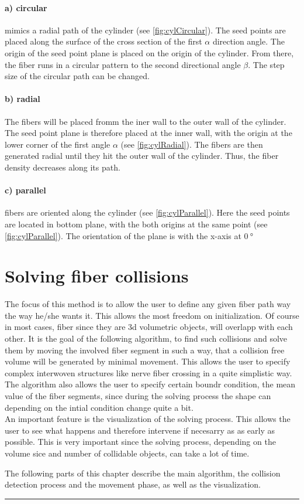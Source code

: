 \paragraph{a) circular} mimics a radial path of the cylinder (see \cref{fig:cylCircular}).
The seed points are placed along the surface of the cross section of the first $\alpha$ direction angle.
The origin of the seed point plane is placed on the origin of the cylinder.
From there, the fiber runs in a circular pattern to the second directional angle $\beta$.
The step size of the circular path can be changed.
% 
\paragraph{b) radial} The fibers will be placed fromm the iner wall to the outer wall of the cylinder.
The seed point plane is therefore placed at the inner wall, with the origin at the lower corner of the first angle $\alpha$ (see \cref{fig:cylRadial}).
The fibers are then generated radial until they hit the outer wall of the cylinder.
Thus, the fiber density decreases along its path.
% 
\paragraph{c) parallel} fibers are oriented along the cylinder (see \cref{fig:cylParallel}).
Here the seed points are located in bottom plane, with the both origins at the same point (see \cref{fig:cylParallel}). The orientation of the plane is with the x-axis at $\SI{0}{\degree}$
% 
% 
% 
\section{Solving fiber collisions}
\label{sec:Solver}
% 
% 
The focus of this method is to allow the user to define any given fiber path way the way he/she wants it.
This allows the most freedom on initialization.
Of course in most cases, fiber since they are 3d volumetric objects, will overlapp with each other.
It is the goal of the following algorithm, to find such collisions and solve them by moving the involved fiber segment in such a way, that a collision free volume will be generated by minimal movement.
% 
This allows the user to specify complex interwoven structures like nerve fiber crossing in a quite simplistic way.
% 
The algorithm also allows the user to specify certain boundr condition, \eg{} the mean value of the fiber segments, since during the solving process the shape can depending on the intial condition change quite a bit.
\\
An important feature is the visualization of the solving process.
This allows the user to see what happens and therefore intervene if necesarry as as early as possible.
This is very important since the solving process, depending on the volume sice and number of collidable objects, can take a lot of time.
\par
% 
The following parts of this chapter describe the main algorithm, \ie{} the collision detection process and the movement phase, as well as the visualization.
% 
\par
\noindent\rule{\textwidth}{2pt}
\par
% 
%
